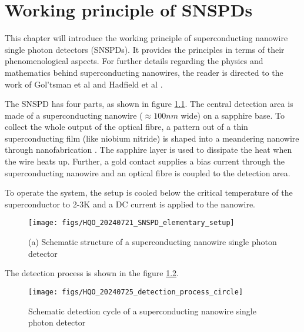 \graphicspath{{/Users/maxim.re/Studium/Physik B.Sc./Semester_8_SS24/Proseminar/Figs Single Photon Detection/}}

\chapter{Working principle of SNSPDs}
\label{sec:SNSPD_working_principle}
This chapter will introduce the working principle of superconducting nanowire single photon detectors (SNSPDs).
It provides the principles in terms of their phenomenological aspects.
For further details regarding the physics and mathematics behind superconducting nanowires, the reader is directed
to the work of Gol’tsman et al \cite{goltsman-2001} and Hadfield et al \cite{natarajan-2012}.

The SNSPD has four parts, as shown in figure \ref{fig:SNSPD_rough_structure}.
The central detection area is made of a superconducting nanowire ($\approx 100nm$ wide) on a sapphire base.
To collect the whole output of the optical fibre, a pattern out of a
thin superconducting film (like niobium nitride) is shaped into a meandering nanowire through nanofabrication \cite{single-quantum-2022}.
The sapphire layer is used to dissipate the heat when the wire heats up.
Further, a gold contact supplies a bias current through the superconducting nanowire and an optical fibre is coupled to the detection area.

To operate the system, the setup is cooled below the critical temperature of the superconductor to
2-3K and a DC current is applied to the nanowire.

\begin{figure}[hhh]
    \centering
    \texttt{[image: figs/HQO\_20240721\_SNSPD\_elementary\_setup]}
    \caption{(a) Schematic structure of a superconducting nanowire single photon detector \cite{steudle-2012}}
    \label{fig:SNSPD_rough_structure}
\end{figure}

The detection process is shown in the figure \ref{fig: SNSPD_process}.

\begin{figure}[hhh]
    \centering
    \texttt{[image: figs/HQO\_20240725\_detection\_process\_circle]}
    \caption{Schematic detection cycle of a superconducting nanowire single photon detector \cite{singlequantum_snsd_nodate}}
    \label{fig: SNSPD_process}
\end{figure}

